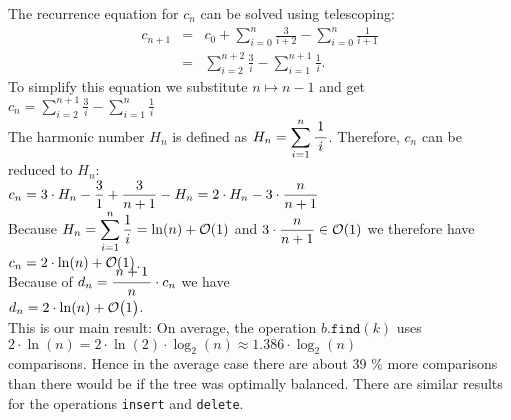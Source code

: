 The recurrence equation for $c_n$ can be solved using  telescoping:
\begin{eqnarray*}  
  c_{n+1} & = & c_0 + \sum\limits_{i=0}^{n} \frac{3}{i+2} - \sum\limits_{i=0}^{n} \frac{1}{i+1} 
\\[0.2cm]
          & = & \sum\limits_{i=2}^{n+2} \frac{3}{i} - \sum\limits_{i=1}^{n+1} \frac{1}{i}.
\end{eqnarray*}
To simplify this equation we substitute $n \mapsto n-1$ and get
\\[0.2cm]
\hspace*{1.3cm}
$c_{n} =  \displaystyle\sum\limits_{i=2}^{n+1} \frac{3}{i} - \sum\limits_{i=1}^{n} \frac{1}{i}$
\\[0.2cm]
The harmonic number  $H_n$ is defined as 
$H_n = \ds\sum\limits_{i=1}^{n} \bruch{1}{i}$.   
Therefore,  $c_n$ can be reduced to $H_n$: 
\\[0.2cm]
\hspace*{1.3cm}
$c_n = \displaystyle 3 \cdot H_n - \frac{3}{1} + \frac{3}{n+1} - H_n  =  \displaystyle 2 \cdot H_n - 3 \cdot \frac{n}{n+1}$
\\[0.2cm] 
Because $H_n = \displaystyle\sum\limits_{i=1}^{n} \frac{1}{i} = \ln(n) + \mathcal{O}(1)$ and $\displaystyle 3 \cdot\frac{n}{n+1} \in \mathcal{O}(1)$
we therefore have
  \\[0.3cm]
\hspace*{1.3cm} 
$\displaystyle c_n = 2 \cdot \ln(n) + \mathcal{O}(1)$.
\\[0.3cm]
Because of  $d_n = \bruch{n+1}{n}\cdot c_n$ we have \\[0.2cm]
\hspace*{1.3cm}
 $\displaystyle d_n = 2 \cdot \ln(n) + \mathcal{O}\bigl(1\bigr)$.
\\[0.2cm]
This is our main result:  On average, the operation $b.\texttt{find}(k)$ uses
\\[0.2cm]
\hspace*{1.3cm}
$2 \cdot \ln(n) = 2 \cdot \ln(2) \cdot \log_2(n) \approx 1.386 \cdot \log_2(n)$ 
\\[0.2cm]
comparisons.  Hence in the average case there are about  39 \% 
more comparisons than there would be if the tree was optimally balanced.
There are similar results for the operations \texttt{insert} and \texttt{delete}.



